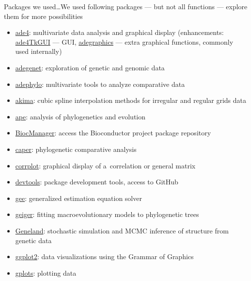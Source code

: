 \documentclass[compress, ucs, xelatex, 11pt, xcolor=svgnames, aspectratio=169,
	hyperref={
		bookmarks=true,
		unicode=true,
		colorlinks=true,
		pdftitle={Molecular data in R},
		plainpages=false,
		pdfauthor={Vojtech Zeisek},
		pdfsubject={Course about phylogeny and evolution in R},
		pdfcreator={XeLaTeX},
		pdfkeywords={R, evolution, phylogeny, molecular data},
		linkcolor=Crimson, %
		anchorcolor=Magenta, %
		citecolor=Magenta, %
		filecolor=Magenta, %
		menucolor=Magenta, %
		urlcolor=DodgerBlue, %
		pdftex},
	url={hyphens, lowtilde} %
	]{beamer}
\begin{document}
\begin{frame}[allowframebreaks]{Packages we used\ldots}{We used following packages --- but not all functions --- explore them for more possibilities}
	\begin{itemize}
		\item \href{https://CRAN.R-project.org/package=ade4}{ade4}: multivariate data analysis and graphical display (enhancements: \href{https://CRAN.R-project.org/package=ade4TkGUI}{ade4TkGUI} --- GUI, \href{https://CRAN.R-project.org/package=adegraphics}{adegraphics} --- extra graphical functions, commonly used internally)
		\item \href{https://CRAN.R-project.org/package=adegenet}{adegenet}: exploration of genetic and genomic data
		\item \href{https://CRAN.R-project.org/package=adephylo}{adephylo}: multivariate tools to analyze comparative data
		\item \href{https://CRAN.R-project.org/package=akima}{akima}: cubic spline interpolation methods for irregular and regular grids data
		\item \href{https://CRAN.R-project.org/package=ape}{ape}: analysis of phylogenetics and evolution
		\item \href{https://CRAN.R-project.org/package=BiocManager}{BiocManager}: access the Bioconductor project package repository
		\item \href{https://CRAN.R-project.org/package=caper}{caper}: phylogenetic comparative analysis
		\item \href{https://CRAN.R-project.org/package=corrplot}{corrplot}: graphical display of a~correlation or general matrix
		\item \href{https://CRAN.R-project.org/package=devtools}{devtools}: package development tools, access to GitHub
		\item \href{https://CRAN.R-project.org/package=gee}{gee}: generalized estimation equation solver
		\item \href{https://CRAN.R-project.org/package=geiger}{geiger}: fitting macroevolutionary models to phylogenetic trees
		\item \href{https://i-pri.org/special/Biostatistics/Software/Geneland/}{Geneland}: stochastic simulation and MCMC inference of structure from genetic data
		\item \href{https://CRAN.R-project.org/package=ggplot2}{ggplot2}: data visualizations using the Grammar of Graphics
		\item \href{https://CRAN.R-project.org/package=gplots}{gplots}: plotting data

\end{itemize}
\end{frame}
\end{document}
